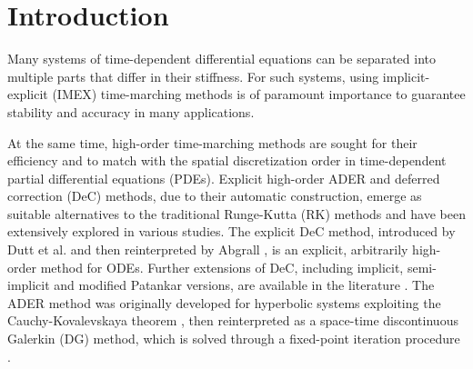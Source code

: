 \section{Introduction} 
\label{sec:introduction} 
Many systems of time-dependent differential equations can be separated into multiple parts that differ in their stiffness. For such systems, using implicit-explicit (IMEX) time-marching methods \cite{pareschi2000implicit} is of paramount importance to guarantee stability and accuracy in many applications.

At the same time, high-order time-marching methods are sought for their efficiency and to match with the spatial discretization order in time-dependent partial differential equations (PDEs). Explicit high-order ADER and deferred correction (DeC) methods, due to their automatic construction, emerge as suitable alternatives to the traditional Runge-Kutta (RK) methods and have been extensively explored in various studies.
The explicit DeC method, introduced by Dutt et al. \cite{dutt2000dec} and then reinterpreted by Abgrall \cite{abgrall2017dec}, is an explicit, arbitrarily high-order method for ODEs. Further extensions of DeC, including implicit, semi-implicit and modified Patankar versions, are available in the literature \cite{christlieb2010integral,minion2003dec,offner2019arbitrary,abgrall2022relaxation,layton2004conservative,speck2015multi}. 
The ADER method was originally developed for hyperbolic systems exploiting the Cauchy-Kovalevskaya theorem \cite{ADERHistorical2, ADERHistorical1,titarev2002ader}, then reinterpreted  as a space-time discontinuous Galerkin (DG) method, which is solved through a fixed-point iteration procedure \cite{ADERModern,zbMATH07627644,dumbser2007FVStiff,boscheri2014direct,micalizzi2023efficient,veiga2023improving,Han_Veiga_2021}.



